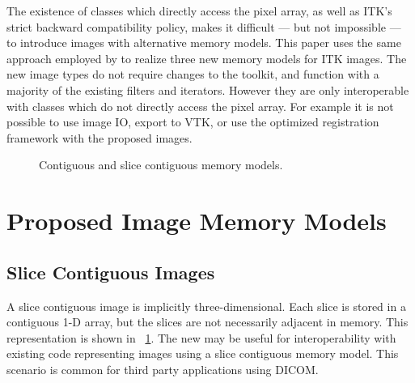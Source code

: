 \documentclass{InsightArticle}
\begin{document}
The existence of classes which directly access the pixel array,
as well as ITK's strict backward compatibility policy,
makes it difficult --- but not impossible --- to introduce images with alternative memory models.
This paper uses the same approach employed by  to realize three new
memory models for ITK images. The new image types do not require changes to the toolkit,
and function with a majority of the existing filters and iterators.
However they are only interoperable with classes which do not directly access the pixel array.
For example it is not possible to use image IO, export to VTK, or
use the optimized registration framework with the proposed images.%
%
\vspace{-1mm}
\begin{figure}[!htb]
    \centering
    \caption{\label{fig:Introduction:Models}%
    Contiguous and slice contiguous memory models.}
\end{figure}
%
\vspace{-7mm}
\section{Proposed Image Memory Models}

\subsection{Slice Contiguous Images}
A slice contiguous image is implicitly three-dimensional.
Each slice is stored in a contiguous 1-D array,
but the slices are not necessarily adjacent in memory.
This representation is shown in \figurename~\ref{fig:Introduction:Models}.
The new  may be useful 
for interoperability with existing code representing images using a
slice contiguous memory model.
This scenario is common for third party applications using DICOM.
\end{document}
